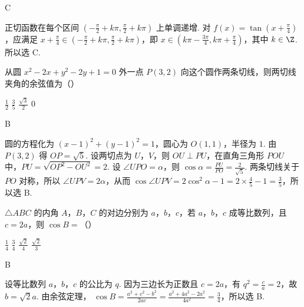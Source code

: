 \begin{answer}
C
\end{answer}

\begin{solution}
正切函数在每个区间 \(\left(-\frac{\pi}{2}+k\pi,\frac{\pi}{2}+k\pi\right)\) 上单调递增. 对 \(f(x)=\tan\left(x+\frac{\pi}{4}\right)\)，应满足
\(x+\frac{\pi}{4}\in\left(-\frac{\pi}{2}+k\pi,\frac{\pi}{2}+k\pi\right)\)，即 \(x\in\left(k\pi-\frac{3\pi}{4},k\pi+\frac{\pi}{4}\right)\)，其中 \(k\in\Z\). 所以选 C.
\end{solution}

\begin{problem}
从圆 \(x^{2} - 2x + y^{2} - 2y + 1 = 0\) 外一点 \(P(3,2)\) 向这个圆作两条切线，则两切线夹角的余弦值为（\quad）

\choices
    {\(\frac{1}{2}\)}
    {\(\frac{3}{5}\)}
    {\(\frac{\sqrt{3}}{2}\)}
    {\(0\)}
\end{problem}

\begin{answer}
B
\end{answer}

\begin{solution}
圆的方程化为 \(\left(x-1\right)^{2}+\left(y-1\right)^{2}=1\)，圆心为 \(O(1,1)\)，半径为 \(1\). 由 \(P(3,2)\) 得 \(OP=\sqrt{5}\). 设两切点为 \(U\)，\(V\)，则 \(OU\perp PU\)，在直角三角形 \(POU\) 中，\(PU=\sqrt{OP^{2}-OU^{2}}=2\). 设 \(\angle UPO=\alpha\)，则 \(\cos\alpha=\frac{PU}{PO}=\frac{2}{\sqrt{5}}\). 两条切线关于 \(PO\) 对称，所以 \(\angle UPV=2\alpha\)，从而 \(\cos\angle UPV=2\cos^{2}\alpha-1=2\times\frac{4}{5}-1=\frac{3}{5}\)，所以选 B.
\end{solution}

\begin{problem}
\(\triangle ABC\) 的内角 \(A\)，\(B\)，\(C\) 的对边分别为 \(a\)，\(b\)，\(c\)，若 \(a\)，\(b\)，\(c\) 成等比数列，且 \(c = 2a\)，则 \(\cos B =\)（\quad）

\choices
    {\(\frac{1}{4}\)}
    {\(\frac{3}{4}\)}
    {\(\frac{\sqrt{2}}{4}\)}
    {\(\frac{\sqrt{2}}{3}\)}
\end{problem}

\begin{answer}
B
\end{answer}

\begin{solution}
设等比数列 \(a\)，\(b\)，\(c\) 的公比为 \(q\). 因为三边长为正数且 \(c=2a\)，有 \(q^{2}=\frac{c}{a}=2\)，故 \(b=\sqrt{2}a\). 由余弦定理，
\(\cos B=\frac{a^{2}+c^{2}-b^{2}}{2ac}=\frac{a^{2}+4a^{2}-2a^{2}}{4a^{2}}=\frac{3}{4}\)，所以选 B.
\end{solution}

